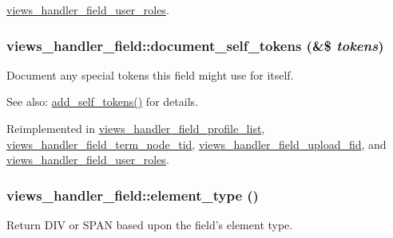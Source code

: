 \hyperlink{classviews__handler__field__user__roles_bf8254566ae390355b35d4593514b033}{views\_\-handler\_\-field\_\-user\_\-roles}.\hypertarget{classviews__handler__field_e33446d1059f13fbfb06a37da04d320e}{
\subsubsection[{document\_\-self\_\-tokens}]{\setlength{\rightskip}{0pt plus 5cm}views\_\-handler\_\-field::document\_\-self\_\-tokens (\&\$ {\em tokens})}}
\label{classviews__handler__field_e33446d1059f13fbfb06a37da04d320e}


Document any special tokens this field might use for itself.

\begin{Desc}
\item[See also:]\hyperlink{classviews__handler__field_c61cc83a4c8c579993a254b5b1e16cbc}{add\_\-self\_\-tokens()} for details. \end{Desc}


Reimplemented in \hyperlink{classviews__handler__field__profile__list_b3950ce980ce3c8e8ce274a25b4e3351}{views\_\-handler\_\-field\_\-profile\_\-list}, \hyperlink{classviews__handler__field__term__node__tid_fa909e51eb90573d468deb29a3943d94}{views\_\-handler\_\-field\_\-term\_\-node\_\-tid}, \hyperlink{classviews__handler__field__upload__fid_8e3f8fc239933c8c09c723dcada273de}{views\_\-handler\_\-field\_\-upload\_\-fid}, and \hyperlink{classviews__handler__field__user__roles_49745a7c1d16f9ee62d5ad6406fe0863}{views\_\-handler\_\-field\_\-user\_\-roles}.\hypertarget{classviews__handler__field_dc0ac73a91e5bfb8da464b3a804a7aa9}{
\subsubsection[{element\_\-type}]{\setlength{\rightskip}{0pt plus 5cm}views\_\-handler\_\-field::element\_\-type ()}}
\label{classviews__handler__field_dc0ac73a91e5bfb8da464b3a804a7aa9}


Return DIV or SPAN based upon the field's element type. 

